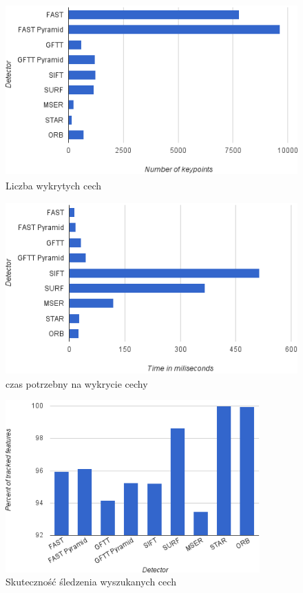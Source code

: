 \begin{figure}[!htb]
\centering
\includegraphics[height=66mm]{pict/01/Number-of-detected-features_thumb.png}
\caption{Liczba wykrytych cech}
\label{fig:Number-of-detected-features_thumb}
\end{figure}

\begin{figure}[!htb]
\centering
\includegraphics[height=66mm]{pict/01/Detection-cost_thumb.png}
\caption{czas potrzebny na wykrycie cechy}
\label{fig:Detection-cost_thumb}
\end{figure}
\begin{figure}[!htb]
\centering
\includegraphics[height=66mm]{pict/01/Percent-of-tracked-feature_thumb.png}
\caption{Skuteczność śledzenia wyszukanych cech}
\label{fig:Percent-of-tracked-feature_thumb}
\end{figure}


